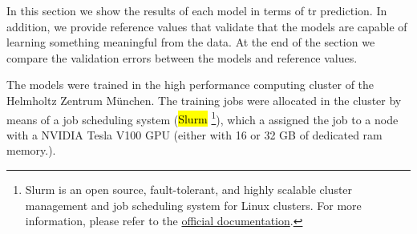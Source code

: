 
\glsresetall
\graphicspath{{./Sections/Results/Resources/}}

In this section we show the results of each model in terms of \gls{tr} prediction. In addition, we provide reference values that validate that the models are capable of learning something meaningful from the data.
At the end of the section we compare the validation errors between the models and reference values.

The models were trained in the high performance computing cluster of the Helmholtz Zentrum München.
The training jobs were allocated in the cluster by means of a job scheduling system (\hl{Slurm} \footnote{Slurm is an open source, fault-tolerant, and highly scalable cluster management and job scheduling system for Linux clusters. For more information, please refer to the \href{https://slurm.schedmd.com/overview.html}{official documentation}.}), which a assigned the job to a node with a NVIDIA Tesla V100 GPU (either with 16 or 32 GB of dedicated ram memory.).
